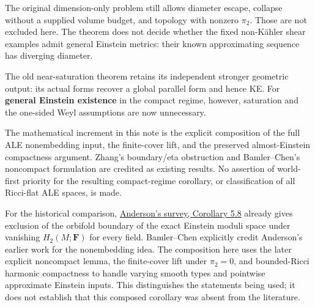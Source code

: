 \documentclass[
  11pt,
]{article}
\begin{document}
The original dimension-only problem still allows diameter escape,
collapse without a supplied volume budget, and topology with nonzero
\(\pi_2\). Those are not excluded here. The theorem does not decide
whether the fixed non-Kähler shear examples admit general Einstein
metrics: their known approximating sequence has diverging diameter.

The old near-saturation theorem retains its independent stronger
geometric output: its actual forms recover a global parallel form and
hence KE. For \textbf{general Einstein existence} in the compact regime,
however, saturation and the one-sided Weyl assumptions are now
unnecessary.

The mathematical increment in this note is the explicit composition of
the full ALE nonembedding input, the finite-cover lift, and the
preserved almost-Einstein compactness argument. Zhang's boundary/eta
obstruction and Bamler--Chen's noncompact formulation are credited as
existing results. No assertion of world-first priority for the resulting
compact-regime corollary, or classification of all Ricci-flat ALE
spaces, is made.

For the historical comparison,
\href{https://www.math.stonybrook.edu/~anderson/einsurv.pdf}{Anderson's
survey, Corollary 5.8} already gives exclusion of the orbifold boundary
of the exact Einstein moduli space under vanishing \(H_2(M;\mathbf F)\)
for every field. Bamler--Chen explicitly credit Anderson's earlier work
for the nonembedding idea. The composition here uses the later explicit
noncompact lemma, the finite-cover lift under \(\pi_2=0\), and
bounded-Ricci harmonic compactness to handle varying smooth types and
pointwise approximate Einstein inputs. This distinguishes the statements
being used; it does not establish that this composed corollary was
absent from the literature.
\end{document}
